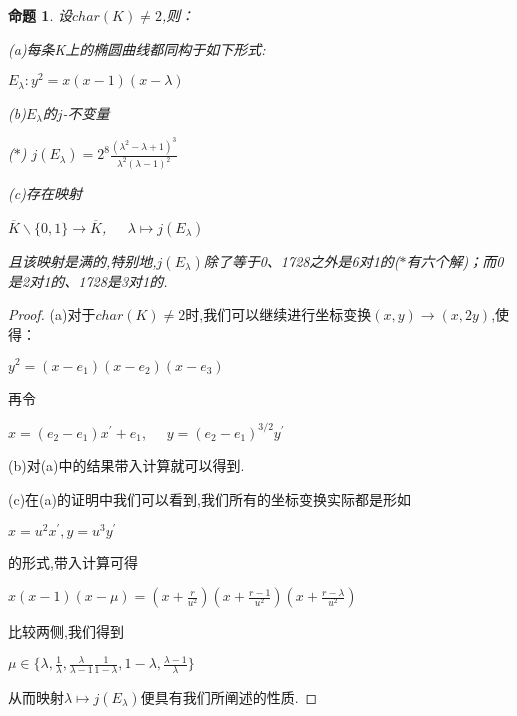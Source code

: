 \documentclass[11pt]{ctexart}
\newtheorem{pro}{命题}[section]
\begin{document}
\begin{pro}设$char(K)\neq 2$,则：

(a)每条K上的椭圆曲线都同构于如下形式:
\begin{center}
    $E_{\lambda}:y^2=x(x-1)(x-\lambda)$
\end{center}

(b)$E_{\lambda}$的$j$-不变量
\begin{center}
   ($\ast$) $j(E_{\lambda})=2^8\frac{(\lambda^2-\lambda+1)^3}{\lambda^2(\lambda-1)^2}$
\end{center}

(c)存在映射
\begin{center}
    $\overline{K}\backslash\{0,1\}\longrightarrow \overline{K}$,~~~$\lambda\mapsto j(E_{\lambda})$
\end{center}

\noindent 且该映射是满的,特别地,$j(E_{\lambda})$除了等于0、1728之外是6对1的($\ast$有六个解)；而0是2对1的、1728是3对1的.


\end{pro}
\begin{proof}

(a)对于$char(K)\neq 2$时,我们可以继续进行坐标变换$(x,y)\rightarrow(x,2y)$,使得：

\begin{center}
    $y^2=(x-e_1)(x-e_2)(x-e_3)$
\end{center}
\noindent 再令
\begin{center}
    $x=(e_2-e_1)x^{\prime}+e_1$,~~~$y=(e_2-e_1)^{3/2}y^{\prime}$
\end{center}
(b)对(a)中的结果带入计算就可以得到.

\noindent (c)在(a)的证明中我们可以看到,我们所有的坐标变换实际都是形如

\begin{center}
    $x=u^2x^{\prime}$$,y=u^3y^{\prime}$
\end{center}
\noindent 的形式,带入计算可得

\begin{center}
    $x(x-1)(x-\mu)=(x+\frac{r}{u^2})(x+\frac{r-1}{u^2})(x+\frac{r-\lambda}{u^2})$
\end{center}
\noindent 比较两侧,我们得到
\begin{center}
    $\mu \in \{\lambda,\frac{1}{\lambda},\frac{\lambda}{\lambda-1}\frac{1}{1-\lambda},1-\lambda,\frac{\lambda-1}{\lambda}\}$
\end{center}
\noindent 从而映射$\lambda \mapsto j(E_{\lambda})$便具有我们所阐述的性质.
\end{proof}
\end{document}
